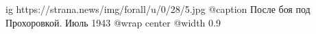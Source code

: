  
 
 
 
 

\ifcmt
  ig https://strana.news/img/forall/u/0/28/5.jpg
	@caption После боя под Прохоровкой. Июль 1943
  @wrap center
  @width 0.9
\fi
